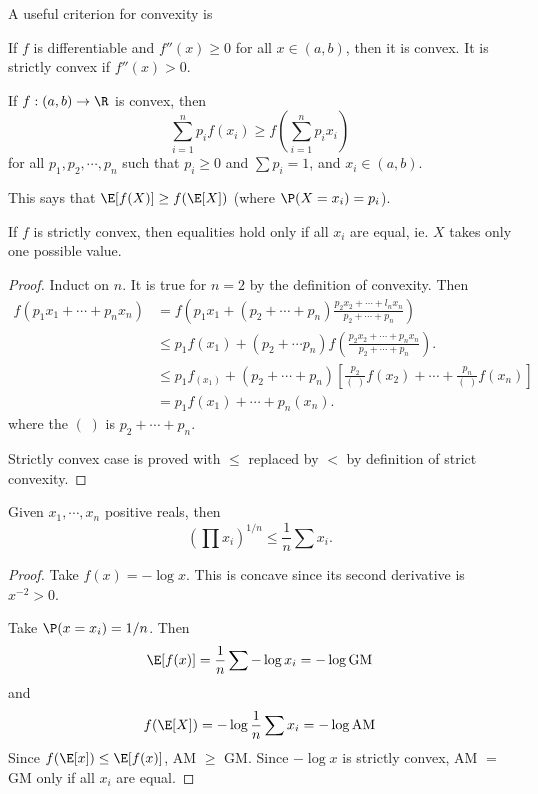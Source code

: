 \documentclass[a4paper]{article}
\begin{document}
A useful criterion for convexity is
\begin{prop}
  If $f$ is differentiable and $f''(x) \geq 0$ for all $x\in (a, b)$, then it is convex. It is strictly convex if $f''(x) > 0$.
\end{prop}

\begin{thm}
  If $f:(a, b) \to \R$ is convex, then
  \[
    \sum_{i = 1}^n p_i f(x_i) \geq f\left(\sum_{i = 1}^n p_ix_i\right)
  \]
  for all $p_1, p_2, \cdots, p_n$ such that $p_i \geq 0$ and $\sum p_i = 1$, and $x_i \in (a, b)$.

  This says that $\E[f(X)] \geq f(\E[X])$ (where $\P(X=x_i) = p_i$).

  If $f$ is strictly convex, then equalities hold only if all $x_i$ are equal, ie. $X$ takes only one possible value.
\end{thm}

\begin{proof}
  Induct on $n$. It is true for $n = 2$ by the definition of convexity. Then
  \begin{align*}
    f(p_1x_1 + \cdots + p_nx_n) &= f\left(p_1x_1 + (p_2 + \cdots + p_n)\frac{p_2x_2 + \cdots + l_nx_n}{p_2 + \cdots + p_n}\right)\\
    &\leq p_1f(x_1) + (p_2 + \cdots p_n)f\left(\frac{p_2x_2 + \cdots + p_n x_n}{p_2 + \cdots + p_n }\right).\\
    &\leq p_1f_(x_1) + (p_2 + \cdots + p_n)\left[\frac{p_2}{(\;)}f(x_2) + \cdots + \frac{p_n}{(\;)}f(x_n)\right]\\
    &= p_1f(x_1) + \cdots + p_n(x_n).
  \end{align*}
  where the $(\;)$ is $p_2 + \cdots + p_n$.

  Strictly convex case is proved with $\leq$ replaced by $<$ by definition of strict convexity.
\end{proof}

\begin{cor}[AM-GM inequality]
  Given $x_1, \cdots, x_n$ positive reals, then
  \[
    \left(\prod x_i\right)^{1/n} \leq \frac{1}{n}\sum x_i.
  \]
\end{cor}

\begin{proof}
  Take $f(x) = -\log x$. This is concave since its second derivative is $x^{-2} > 0$.

  Take $\P(x = x_i) = 1/n$. Then
  \[
    \E[f(x)] = \frac{1}{n}\sum -\log x_i = -\log \text{GM}
  \]
  and
  \[
    f(\E[X]) = -\log \frac{1}{n}\sum x_i = -\log\text{AM}
  \]
  Since $f(\E[x]) \leq \E[f(x)]$, AM $\geq$ GM. Since $-\log x$ is strictly convex, AM $=$ GM only if all $x_i$ are equal.
\end{proof}
\end{document}
